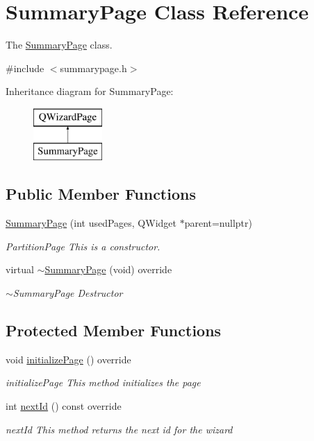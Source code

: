 \hypertarget{class_summary_page}{}\section{Summary\+Page Class Reference}
\label{class_summary_page}


The \mbox{\hyperlink{class_summary_page}{Summary\+Page}} class.  




{\ttfamily \#include $<$summarypage.\+h$>$}

Inheritance diagram for Summary\+Page\+:\begin{figure}[H]
\begin{center}
\leavevmode
\includegraphics[height=2.000000cm]{class_summary_page}
\end{center}
\end{figure}
\subsection*{Public Member Functions}
\begin{DoxyCompactItemize}
\item 
\mbox{\hyperlink{class_summary_page_a798aff071dddd63b2b5ee049fa87e6a7}{Summary\+Page}} (int used\+Pages, Q\+Widget $\ast$parent=nullptr)
\begin{DoxyCompactList}\small\item\em Partition\+Page This is a constructor. \end{DoxyCompactList}\item 
virtual \mbox{\hyperlink{class_summary_page_a93b880d988f9f85f28c3d239ce1457e0}{$\sim$\+Summary\+Page}} (void) override
\begin{DoxyCompactList}\small\item\em $\sim$\+Summary\+Page Destructor \end{DoxyCompactList}\end{DoxyCompactItemize}
\subsection*{Protected Member Functions}
\begin{DoxyCompactItemize}
\item 
void \mbox{\hyperlink{class_summary_page_a987e9e51fef71237349acb3b47818737}{initialize\+Page}} () override
\begin{DoxyCompactList}\small\item\em initialize\+Page This method initializes the page \end{DoxyCompactList}\item 
int \mbox{\hyperlink{class_summary_page_a343463680aad6cf8357c9f13fe23e57d}{next\+Id}} () const override
\begin{DoxyCompactList}\small\item\em next\+Id This method returns the next id for the wizard \end{DoxyCompactList}\end{DoxyCompactItemize}
